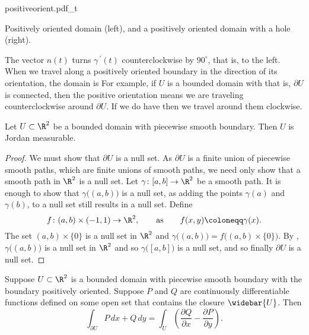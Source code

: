 \begin{myfigureht}
{positiveorient.pdf_t}
\caption{Positively oriented domain (left), and a positively oriented
domain with a hole (right).\label{fig:positiveorient}}
\end{myfigureht}

The vector $n(t)$ turns $\gamma^{\:\prime}(t)$
counterclockwise by $90^\circ$, that is, to the left.
When we travel along a positively oriented boundary
in the direction of its orientation,
the domain is 
For example,
if $U$ is a bounded domain with  that is, $\partial U$
is connected, then the positive orientation means we are traveling
counterclockwise around $\partial U$.  If we do have  then we
travel around them clockwise.

\begin{prop}
Let $U \subset \R^2$ be a bounded domain with piecewise smooth boundary.
Then $U$ is Jordan measurable.
\end{prop}

\begin{proof}
We must show that
$\partial U$ is a null set.  As $\partial U$ is a finite
union of piecewise smooth paths, which 
are finite unions of smooth paths, we need only show that 
a smooth path in $\R^2$ is a null set.
Let $\gamma \colon [a,b] \to \R^2$ be a smooth path.
It is enough to show that
$\gamma\bigl((a,b)\bigr)$ is a null set, as adding 
the points $\gamma(a)$ and $\gamma(b)$,
to a null set still results in a null set.
Define
\begin{equation*}
f \colon (a,b) \times (-1,1) \to \R^2,
\qquad \text{as} \qquad
f(x,y) \coloneqq \gamma(x) .
\end{equation*}
The set $(a,b) \times \{ 0 \}$ is a null set in $\R^2$ and
$\gamma\bigl((a,b)\bigr) = f\bigl( (a,b) \times \{ 0 \} \bigr)$.
By , 
$\gamma\bigl((a,b)\bigr)$ is a null set in $\R^2$
and so
$\gamma\bigl([a,b]\bigr)$ is a null set, and 
so finally $\partial U$ is a null set.
\end{proof}

\begin{thm}[Green]
Suppose $U \subset \R^2$ is a bounded domain with piecewise smooth boundary with
the boundary positively oriented.  Suppose $P$ and $Q$ are continuously
differentiable functions defined on some open set that contains the closure
$\widebar{U}$.  Then
\begin{equation*}
\int_{\partial U}
P \, dx + Q\,  dy
=
\int_{U}
\left(\frac{\partial Q}{\partial x} - \frac{\partial P}{\partial y} \right)
.
\end{equation*}
\end{thm}

